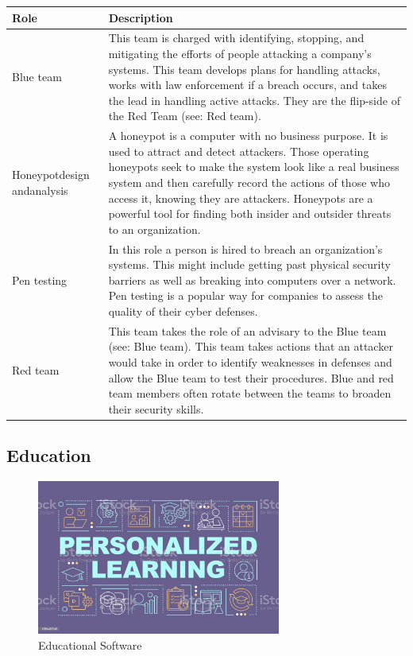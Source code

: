 \begin{table}[H]
	\begin{center}
		\begin{tabular}{p{1in}|p{3.4in}} 
			\textbf{Role} & \textbf{Description}\\
			\hline
			Blue team & This team is charged with identifying, stopping, and mitigating the efforts of people attacking a company's systems. This team develops plans for handling attacks, works with law enforcement if a breach occurs, and takes the lead in handling active attacks. They are the flip-side of the Red Team (see: Red team).\\
			\hline
			Honeypot\linebreak design and\linebreak analysis & A honeypot is a computer with no business purpose. It is used to attract and detect attackers. Those operating honeypots seek to make the system look like a real business system and then carefully record the actions of those who access it, knowing they are attackers. Honeypots are a powerful tool for finding both insider and outsider threats to an organization.\\
			\hline
			Pen testing & In this role a person is hired to breach an organization's systems. This might include getting past physical security barriers as well as breaking into computers over a network. Pen testing is a popular way for companies to assess the quality of their cyber defenses.\\
			\hline
			Red team & This team takes the role of an advisary to the Blue team (see: Blue team). This team takes actions that an attacker would take in order to identify weaknesses in defenses and allow the Blue team to test their procedures. Blue and red team members often rotate between the teams to broaden their security skills.\\
			\hline
		\end{tabular}
	\end{center}
\end{table}


\subsection{Education}

\begin{figure}[H]
	\begin{center}
		\caption{Educational Software}
		\vskip 4pt
		\includegraphics[height=2in]{images/careers/istockphoto-1394432243-1024x1024.jpg}
	\end{center}
\end{figure}


